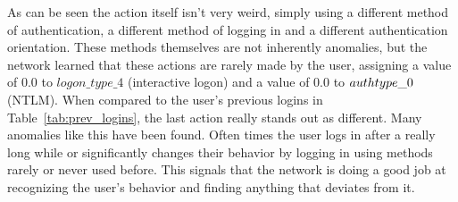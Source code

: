 As can be seen the action itself isn't very weird, simply using a different method of authentication, a different method of logging in and a different authentication orientation. These methods themselves are not inherently anomalies, but the network learned that these actions are rarely made by the user, assigning a value of 0.0 to \(logon\_type\_4\) (interactive logon) and a value of 0.0 to \(auth\-type\_0\) (NTLM). When compared to the user's previous logins in Table~\ref{tab:prev_logins}, the last action really stands out as different. Many anomalies like this have been found. Often times the user logs in after a really long while or significantly changes their behavior by logging in using methods rarely or never used before. This signals that the network is doing a good job at recognizing the user's behavior and finding anything that deviates from it.